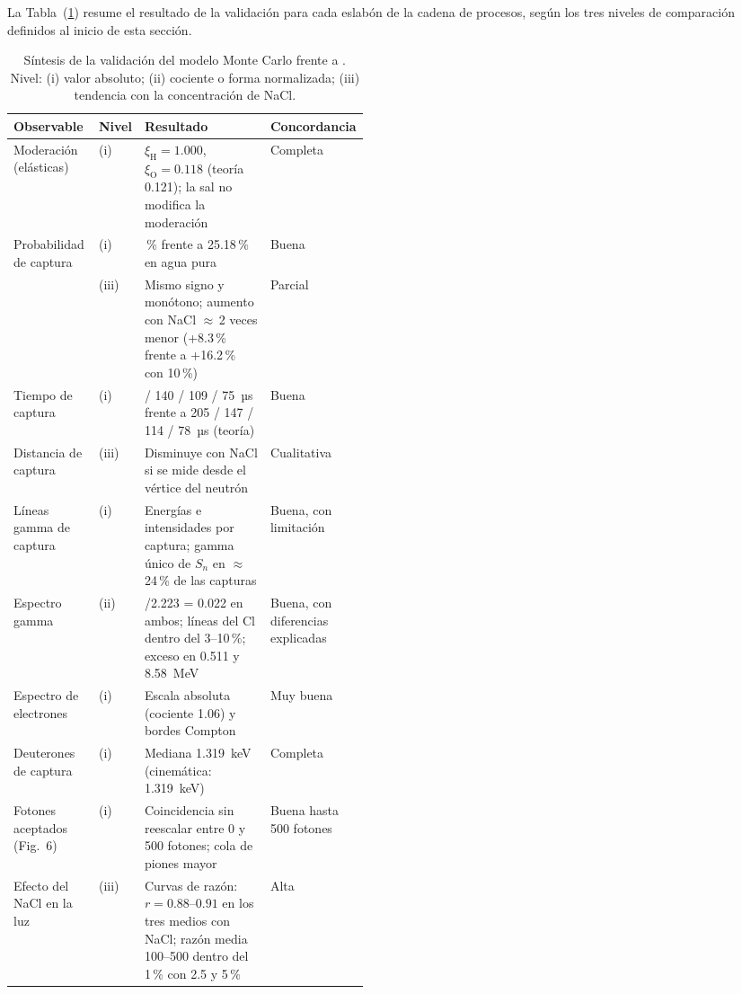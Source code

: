 La Tabla~(\ref{tab:sintesis-validacion}) resume el resultado de la validación para cada eslabón de la cadena de procesos, según los tres niveles de comparación definidos al inicio de esta sección.

\begin{table}[!htbp]
	\centering
	\small
	\captionsetup{width=\linewidth,justification=justified,singlelinecheck=false}
	\caption[Síntesis de la validación del modelo frente a Sidelnik et al. (2020)]{Síntesis de la validación del modelo Monte Carlo frente a \protect\citet{Sidelnik2020}. Nivel: (i) valor absoluto; (ii) cociente o forma normalizada; (iii) tendencia con la concentración de NaCl.}
	\label{tab:sintesis-validacion}
	\renewcommand{\arraystretch}{1.2}
	\begin{tabularx}{\linewidth}{>{\raggedright\arraybackslash}p{0.24\linewidth} >{\centering\arraybackslash}p{0.06\linewidth} >{\raggedright\arraybackslash}X >{\centering\arraybackslash}p{0.16\linewidth}}
		\toprule
		\textbf{Observable} & \textbf{Nivel} & \textbf{Resultado} & \textbf{Concordancia} \\
		\midrule
		Moderación (elásticas) & (i) & $\xi_{\mathrm{H}}=1.000$, $\xi_{\mathrm{O}}=0.118$ (teoría 0.121); la sal no modifica la moderación & Completa \\
		Probabilidad de captura & (i) & 24.08\,\% frente a 25.18\,\% en agua pura & Buena \\
		 & (iii) & Mismo signo y monótono; aumento con NaCl $\approx$\,2 veces menor (+8.3\,\% frente a +16.2\,\% con 10\,\%) & Parcial \\
		Tiempo de captura & (i) & 192 / 140 / 109 / 75~µs frente a 205 / 147 / 114 / 78~µs (teoría) & Buena \\
		Distancia de captura & (iii) & Disminuye con NaCl si se mide desde el vértice del neutrón & Cualitativa \\
		Líneas gamma de captura & (i) & Energías e intensidades por captura; gamma único de $S_n$ en $\approx$\,24\,\% de las capturas & Buena, con limitación \\
		Espectro gamma & (ii) & 6.13/2.223 = 0.022 en ambos; líneas del Cl dentro del 3--10\,\%; exceso en 0.511 y 8.58~MeV & Buena, con diferencias explicadas \\
		Espectro de electrones & (i) & Escala absoluta (cociente 1.06) y bordes Compton & Muy buena \\
		Deuterones de captura & (i) & Mediana 1.319~keV (cinemática: 1.319~keV) & Completa \\
		Fotones aceptados (Fig.~6) & (i) & Coincidencia sin reescalar entre 0 y 500 fotones; cola de piones mayor & Buena hasta 500 fotones \\
		Efecto del NaCl en la luz & (iii) & Curvas de razón: $r=0.88$--$0.91$ en los tres medios con NaCl; razón media 100--500 dentro del 1\,\% con 2.5 y 5\,\% & Alta \\
		\bottomrule
	\end{tabularx}
\end{table}

